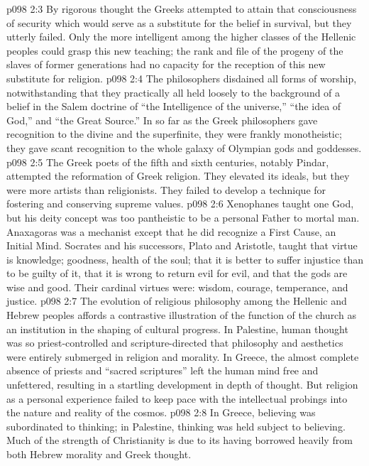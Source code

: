 \vs p098 2:3 By rigorous thought the Greeks attempted to attain that consciousness of security which would serve as a substitute for the belief in survival, but they utterly failed. Only the more intelligent among the higher classes of the Hellenic peoples could grasp this new teaching; the rank and file of the progeny of the slaves of former generations had no capacity for the reception of this new substitute for religion.
\vs p098 2:4 \pc The philosophers disdained all forms of worship, notwithstanding that they practically all held loosely to the background of a belief in the Salem doctrine of “the Intelligence of the universe,” “the idea of God,” and “the Great Source.” In so far as the Greek philosophers gave recognition to the divine and the superfinite, they were frankly monotheistic; they gave scant recognition to the whole galaxy of Olympian gods and goddesses.
\vs p098 2:5 The Greek poets of the fifth and sixth centuries, notably Pindar, attempted the reformation of Greek religion. They elevated its ideals, but they were more artists than religionists. They failed to develop a technique for fostering and conserving supreme values.
\vs p098 2:6 Xenophanes taught one God, but his deity concept was too pantheistic to be a personal Father to mortal man. Anaxagoras was a mechanist except that he did recognize a First Cause, an Initial Mind. Socrates and his successors, Plato and Aristotle, taught that virtue is knowledge; goodness, health of the soul; that it is better to suffer injustice than to be guilty of it, that it is wrong to return evil for evil, and that the gods are wise and good. Their cardinal virtues were: wisdom, courage, temperance, and justice.
\vs p098 2:7 \pc The evolution of religious philosophy among the Hellenic and Hebrew peoples affords a contrastive illustration of the function of the church as an institution in the shaping of cultural progress. In Palestine, human thought was so priest\hyp{}controlled and scripture\hyp{}directed that philosophy and aesthetics were entirely submerged in religion and morality. In Greece, the almost complete absence of priests and “sacred scriptures” left the human mind free and unfettered, resulting in a startling development in depth of thought. But religion as a personal experience failed to keep pace with the intellectual probings into the nature and reality of the cosmos.
\vs p098 2:8 In Greece, believing was subordinated to thinking; in Palestine, thinking was held subject to believing. Much of the strength of Christianity is due to its having borrowed heavily from both Hebrew morality and Greek thought.
